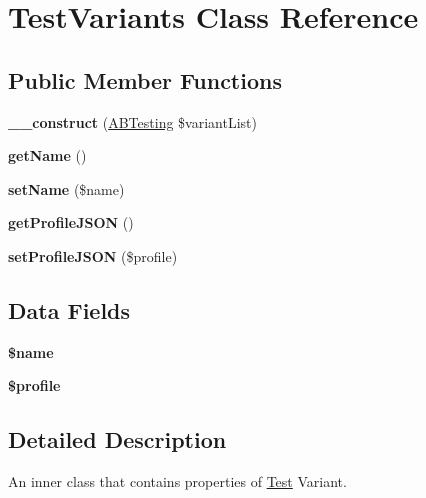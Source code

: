 \hypertarget{class_test_variants}{\section{Test\+Variants Class Reference}
\label{class_test_variants}
}
\subsection*{Public Member Functions}
\begin{DoxyCompactItemize}
\item 
\hypertarget{class_test_variants_a338b4e4625317ab64e6ea05c5b7fd31c}{{\bfseries \+\_\+\+\_\+construct} (\hyperlink{class_a_b_testing}{A\+B\+Testing} \$variant\+List)}\label{class_test_variants_a338b4e4625317ab64e6ea05c5b7fd31c}

\item 
\hypertarget{class_test_variants_a3d0963e68bb313b163a73f2803c64600}{{\bfseries get\+Name} ()}\label{class_test_variants_a3d0963e68bb313b163a73f2803c64600}

\item 
\hypertarget{class_test_variants_a2fe666694997d047711d7653eca2f132}{{\bfseries set\+Name} (\$name)}\label{class_test_variants_a2fe666694997d047711d7653eca2f132}

\item 
\hypertarget{class_test_variants_a6a1253f3c7290f492455bec309fddf6f}{{\bfseries get\+Profile\+J\+S\+O\+N} ()}\label{class_test_variants_a6a1253f3c7290f492455bec309fddf6f}

\item 
\hypertarget{class_test_variants_aa1f2fb4131dfdf757556515e0db7aabc}{{\bfseries set\+Profile\+J\+S\+O\+N} (\$profile)}\label{class_test_variants_aa1f2fb4131dfdf757556515e0db7aabc}

\end{DoxyCompactItemize}
\subsection*{Data Fields}
\begin{DoxyCompactItemize}
\item 
\hypertarget{class_test_variants_ab2fc40d43824ea3e1ce5d86dee0d763b}{{\bfseries \$name}}\label{class_test_variants_ab2fc40d43824ea3e1ce5d86dee0d763b}

\item 
\hypertarget{class_test_variants_aada8b96bccbcf78962195b117acdc07b}{{\bfseries \$profile}}\label{class_test_variants_aada8b96bccbcf78962195b117acdc07b}

\end{DoxyCompactItemize}


\subsection{Detailed Description}
An inner class that contains properties of \hyperlink{class_test}{Test} Variant. 
